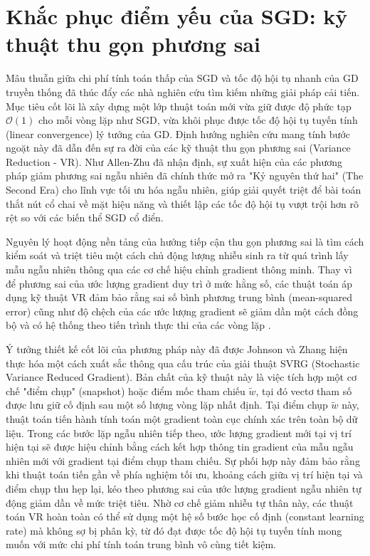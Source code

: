 \section{Khắc phục điểm yếu của SGD: kỹ thuật thu gọn phương sai}

Mâu thuẫn giữa chi phí tính toán thấp của SGD và tốc độ hội tụ nhanh của GD truyền thống đã thúc đẩy các nhà nghiên cứu tìm kiếm những giải pháp cải tiến. Mục tiêu cốt lõi là xây dựng một lớp thuật toán mới vừa giữ được độ phức tạp $\mathcal{O}(1)$ cho mỗi vòng lặp như SGD, vừa khôi phục được tốc độ hội tụ tuyến tính (linear convergence) lý tưởng của GD. Định hướng nghiên cứu mang tính bước ngoặt này đã dẫn đến sự ra đời của các kỹ thuật thu gọn phương sai (Variance Reduction - VR). Như Allen-Zhu \cite{allen2017katyusha} đã nhận định, sự xuất hiện của các phương pháp giảm phương sai ngẫu nhiên đã chính thức mở ra "Kỷ nguyên thứ hai" (The Second Era) cho lĩnh vực tối ưu hóa ngẫu nhiên, giúp giải quyết triệt để bài toán thắt nút cổ chai về mặt hiệu năng và thiết lập các tốc độ hội tụ vượt trội hơn rõ rệt so với các biến thể SGD cổ điển.

Nguyên lý hoạt động nền tảng của hướng tiếp cận thu gọn phương sai là tìm cách kiểm soát và triệt tiêu một cách chủ động lượng nhiễu sinh ra từ quá trình lấy mẫu ngẫu nhiên thông qua các cơ chế hiệu chỉnh gradient thông minh. Thay vì để phương sai của ước lượng gradient duy trì ở mức hằng số, các thuật toán áp dụng kỹ thuật VR đảm bảo rằng sai số bình phương trung bình (mean-squared error) cũng như độ chệch của các ước lượng gradient sẽ giảm dần một cách đồng bộ và có hệ thống theo tiến trình thực thi của các vòng lặp \cite{driggs2022accelerating}. 

Ý tưởng thiết kế cốt lõi của phương pháp này đã được Johnson và Zhang \cite{johnson2013accelerating} hiện thực hóa một cách xuất sắc thông qua cấu trúc của giải thuật SVRG (Stochastic Variance Reduced Gradient). Bản chất của kỹ thuật này là việc tích hợp một cơ chế "điểm chụp" (snapshot) hoặc điểm mốc tham chiếu $\tilde{w}$, tại đó vectơ tham số được lưu giữ cố định sau một số lượng vòng lặp nhất định. Tại điểm chụp $\tilde{w}$ này, thuật toán tiến hành tính toán một gradient toàn cục chính xác trên toàn bộ dữ liệu. Trong các bước lặp ngẫu nhiên tiếp theo, ước lượng gradient mới tại vị trí hiện tại sẽ được hiệu chỉnh bằng cách kết hợp thông tin gradient của mẫu ngẫu nhiên mới với gradient tại điểm chụp tham chiếu. Sự phối hợp này đảm bảo rằng khi thuật toán tiến gần về phía nghiệm tối ưu, khoảng cách giữa vị trí hiện tại và điểm chụp thu hẹp lại, kéo theo phương sai của ước lượng gradient ngẫu nhiên tự động giảm dần về mức triệt tiêu. Nhờ cơ chế giảm nhiễu tự thân này, các thuật toán VR hoàn toàn có thể sử dụng một hệ số bước học cố định (constant learning rate) mà không sợ bị phân kỳ, từ đó đạt được tốc độ hội tụ tuyến tính mong muốn với mức chi phí tính toán trung bình vô cùng tiết kiệm.

